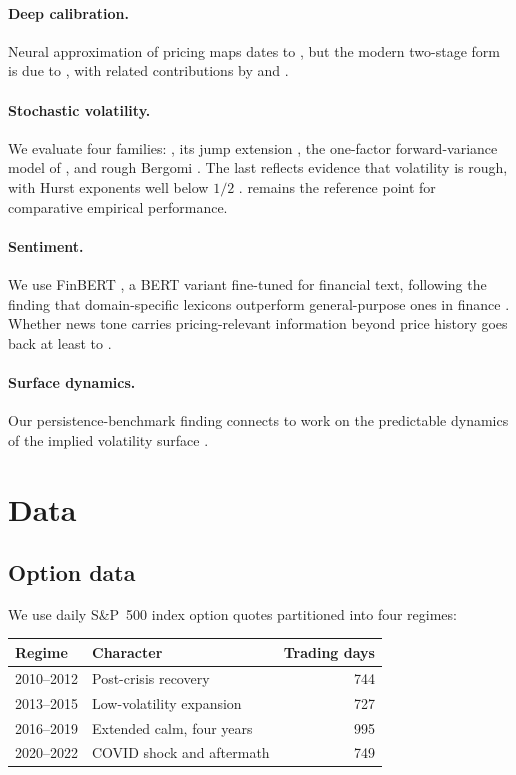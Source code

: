 \documentclass[11pt,a4paper]{article}
\begin{document}
\paragraph{Deep calibration.} Neural approximation of pricing maps dates to
\citet{hutchinson1994}, but the modern two-stage form is due to
\citet{horvath2021}, with related contributions by \citet{bayer2018} and
\citet{ferguson2018}.

\paragraph{Stochastic volatility.} We evaluate four families:
\citet{heston1993}, its jump extension \citet{bates1996}, the one-factor
forward-variance model of \citet{bergomi2005}, and rough Bergomi
\citep{bayer2016}. The last reflects evidence that volatility is rough, with
Hurst exponents well below $1/2$ \citep{gatheral2018}. \citet{bakshi1997}
remains the reference point for comparative empirical performance.

\paragraph{Sentiment.} We use FinBERT \citep{araci2019}, a BERT variant
\citep{devlin2019} fine-tuned for financial text, following the finding that
domain-specific lexicons outperform general-purpose ones in finance
\citep{loughran2011}. Whether news tone carries pricing-relevant information
beyond price history goes back at least to \citet{tetlock2007}.

\paragraph{Surface dynamics.} Our persistence-benchmark finding connects to work
on the predictable dynamics of the implied volatility surface
\citep{goncalves2006,cont2002}.

\section{Data}

\subsection{Option data}
We use daily S\&P~500 index option quotes partitioned into four regimes:

\begin{table}[h]
\centering
\begin{tabular}{llr}
\toprule
Regime & Character & Trading days \\
\midrule
2010--2012 & Post-crisis recovery & 744 \\
2013--2015 & Low-volatility expansion & 727 \\
2016--2019 & Extended calm, four years & 995 \\
2020--2022 & COVID shock and aftermath & 749 \\
\bottomrule
\end{tabular}
\end{table}
\end{document}
